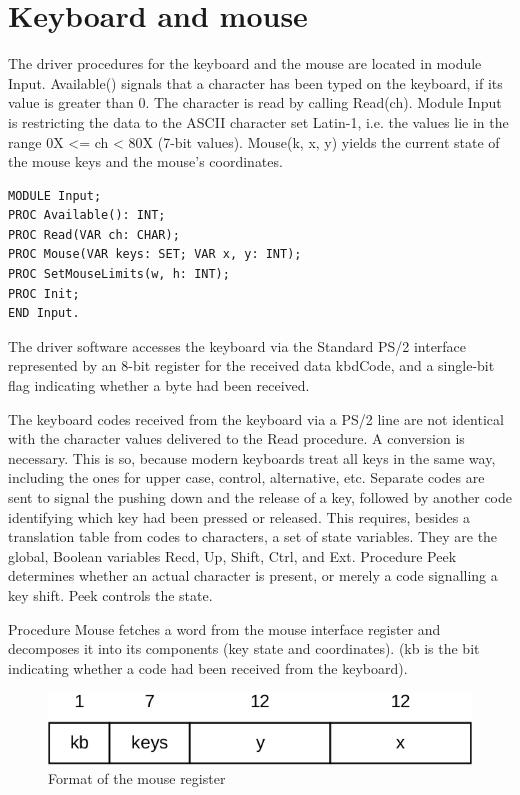 \section{Keyboard and mouse}
The driver procedures for the keyboard and the mouse are located in module Input. Available()
signals that a character has been typed on the keyboard, if its value is greater than 0. The
character is read by calling Read(ch). Module Input is restricting the data to the ASCII character set
Latin-1, i.e. the values lie in the range 0X <= ch < 80X (7-bit values). Mouse(k, x, y) yields the
current state of the mouse keys and the mouse's coordinates.
\begin{verbatim}
MODULE Input;
PROC Available(): INT;
PROC Read(VAR ch: CHAR);
PROC Mouse(VAR keys: SET; VAR x, y: INT);
PROC SetMouseLimits(w, h: INT);
PROC Init;
END Input.
\end{verbatim}

The driver software accesses the keyboard via the Standard PS/2 interface represented by an 8-bit
register for the received data kbdCode, and a single-bit flag indicating whether a byte had been
received.

The keyboard codes received from the keyboard via a PS/2 line are not identical with the character
values delivered to the Read procedure. A conversion is necessary. This is so, because modern
keyboards treat all keys in the same way, including the ones for upper case, control, alternative,
etc. Separate codes are sent to signal the pushing down and the release of a key, followed by
another code identifying which key had been pressed or released. This requires, besides a
translation table from codes to characters, a set of state variables. They are the global, Boolean
variables Recd, Up, Shift, Ctrl, and Ext. Procedure Peek determines whether an actual character is
present, or merely a code signalling a key shift. Peek controls the state.

Procedure Mouse fetches a word from the mouse interface register and decomposes it into its
components (key state and coordinates). (kb is the bit indicating whether a code had been received
from the keyboard).
\begin{figure}
	\label{fig:format}
	\centering
	\includegraphics[width=.75\textwidth]{i/z}
	\caption{Format of the mouse register}
\end{figure}

